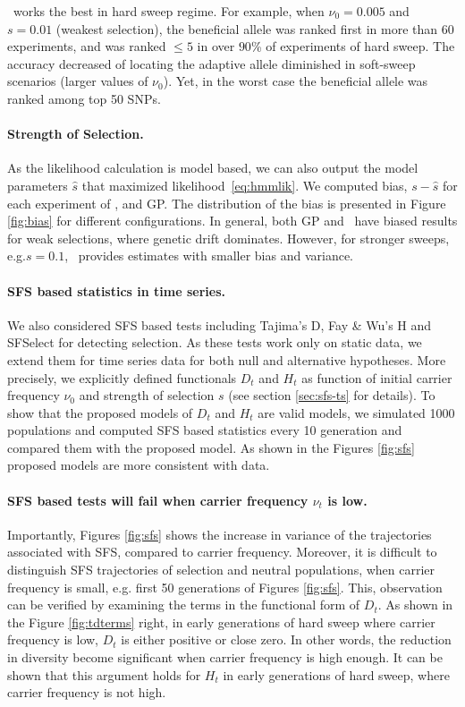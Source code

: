 \documentclass[11pt]{article}
\def\comale{\text{{\sc Comale}}}
\begin{document}
\comale\  works the best in hard sweep regime. For example, when
$\nu_0=0.005$ and $s=0.01$ (weakest selection), the beneficial allele
was ranked first in more than 60 experiments, and was ranked $\le 5$
in over $90$\% of experiments of hard sweep. The accuracy decreased of
locating the adaptive allele diminished in soft-sweep scenarios
(larger values of $\nu_0$). Yet, in the worst case the beneficial
allele was ranked among top 50 SNPs.

\paragraph{Strength of Selection.}
As the likelihood calculation is model based, we can also output the
model parameters $\hat{s}$ that maximized
likelihood~\eqref{eq:hmmlik}. We computed bias, $s-\hat{s}$ for each
experiment of \comale, and GP. The distribution of the bias is
presented in Figure \ref{fig:bias} for different configurations. In
general, both GP and \comale\ have biased results for weak selections,
where genetic drift dominates. However, for stronger sweeps,
e.g.$s=0.1$, \comale\ provides estimates with smaller bias and
variance.


\paragraph{SFS based statistics in time series.} 
We also considered SFS based tests including Tajima's D, Fay \& Wu's H and 
SFSelect for detecting selection. 
As these tests work only on static data, we extend them for time series data 
for both null and alternative hypotheses.
More precisely, we explicitly defined functionals $D_t$ and $H_t$ as function 
of initial carrier frequency $\nu_0$ and strength of selection $s$ (see section 
\ref{sec:sfs-ts} for details).
 To show that the proposed models of $D_t$ and $H_t$ are valid models, we 
 simulated 1000 populations and computed SFS based statistics every 10 
 generation and compared them with the proposed model.
 As shown in the Figures \ref{fig:sfs} proposed models are more consistent with data.

\paragraph{SFS based tests will fail when carrier frequency $\nu_t$ is low.}
Importantly,  Figures \ref{fig:sfs} shows the increase in variance of the trajectories associated with SFS, compared to carrier frequency. Moreover, it is difficult to distinguish SFS trajectories of selection and neutral populations, when carrier frequency is small, e.g. first 50 generations of Figures \ref{fig:sfs}.
This, observation can be verified by examining the terms in the functional form of $D_t$.
As shown in the Figure 
\ref{fig:tdterms} right, in early 
generations of hard sweep where carrier frequency is low, 
$D_t$ is either 
positive or close zero. In other words, the reduction in 
diversity become 
significant when carrier frequency is high enough.
It can be shown that this argument holds for $H_t$ in early generations 
of hard sweep, where carrier frequency is not high.
\end{document}
